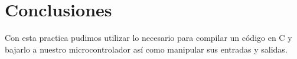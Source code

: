 \documentclass{article}
\begin{document}
\section{Conclusiones}
Con esta practica pudimos utilizar lo necesario para compilar un código en C y bajarlo a nuestro microcontrolador así como manipular sus entradas y salidas.

\end{document}

